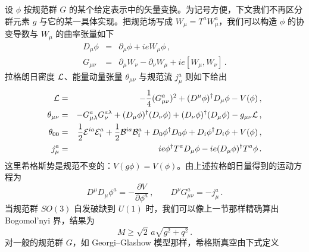 设 $\phi$ 按规范群 $G$ 的某个给定表示中的矢量变换。为记号方便，下文我们不再区分群元素 $g$ 与它的某一具体实现。把规范场写成 $W_\mu=T^aW^a_\mu$，我们可以构造 $\phi$ 的协变导数与 $W_\mu$ 的曲率张量如下
\begin{eqnarray}
D_\mu \phi &=& \partial_{\mu} \phi + ie W_{\mu} \phi\,,
\nonumber \\
G_{\mu\nu}&=&\partial_\mu W_\nu -\partial_\nu W_\mu +
ie [W_\mu, W_\nu] \,.
\nonumber
\end{eqnarray}
拉格朗日密度 ${\cal L}$、能量动量张量 $\theta_{\mu\nu}$ 与规范流 $j^a_\mu$ 则如下给出
\begin{eqnarray}
{\cal L}&=&-\frac{1}{4}(G^a_{\mu\nu})^2+(D^\mu\phi)^\dagger D_\mu\phi
-V(\phi) \,,
\nonumber\\
\theta_{\mu\nu}&=&-G^a_{\mu\lambda}G^{a\lambda}_\nu +
(D_\mu\phi)^\dagger(D_\nu\phi) + (D_\nu\phi)^\dagger(D_\mu\phi) 
- g_{\mu\nu} {\cal L} \,,
\nonumber \\
\theta_{00}&=& \frac{1}{2}{\cal E}^{ia}{\cal E}^a_i +
\frac{1}{2}{\cal B}^{ia}{\cal B}^a_i +D_0\phi^\dagger D_0\phi +
D_i\phi^\dagger D_i\phi + V(\phi)\,,
\nonumber \\
j^a_\mu &=& ie \phi^\dagger T^a D_\mu\phi -
ie (D_\mu\phi)^\dagger T^a \phi\,.
\label{LIII}
\end{eqnarray}
这里希格斯势是规范不变的：$V(g\phi)=V(\phi)$。由上述拉格朗日量得到的运动方程为
\begin{equation}
D^\mu D_\mu\phi^a=-\frac{\partial V}{\partial \phi^a}\,,\qquad
D^\nu G^a_{\mu\nu} = - j_\mu^a\,.
\label{LIV}
\end{equation}
当规范群 $SO(3)$ 自发破缺到 $U(1)$ 时，我们可以像上一节那样精确算出 Bogomol'nyi 界，结果为
\begin{equation}
M\geq \sqrt 2 \, a \sqrt{g^2 + q^2}\,.
\label{Bbound}
\end{equation}
对一般的规范群 $G$，如 Georgi–Glashow 模型那样，希格斯真空由下式定义

